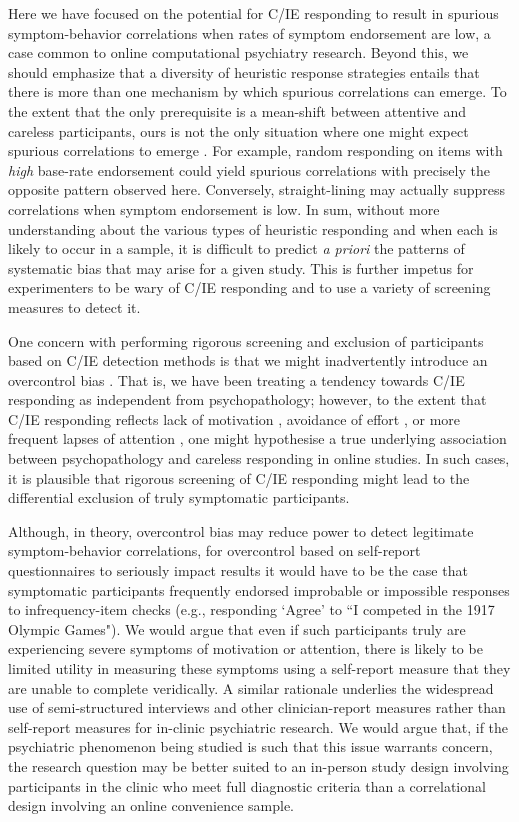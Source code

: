 \documentclass[a4paper,notitlepage,12pt]{article}
\begin{document}
Here we have focused on the potential for C/IE responding to result in spurious symptom-behavior correlations when rates of symptom endorsement are low, a case common to online computational psychiatry research. Beyond this, we should emphasize that a diversity of heuristic response strategies entails that there is more than one mechanism by which spurious correlations can emerge. To the extent that the only prerequisite is a mean-shift between attentive and careless participants, ours is not the only situation where one might expect spurious correlations to emerge \cite{huang2015insufficient}. For example, random responding on items with \emph{high} base-rate endorsement could yield spurious correlations with precisely the opposite pattern observed here. Conversely, straight-lining may actually suppress correlations when symptom endorsement is low. In sum, without more understanding about the various types of heuristic responding and when each is likely to occur in a sample, it is difficult to predict {\it a priori} the patterns of systematic bias that may arise for a given study. This is further impetus for experimenters to be wary of C/IE responding and to use a variety of screening measures to detect it. 

One concern with performing rigorous screening and exclusion of participants based on C/IE detection methods is that we might inadvertently introduce an overcontrol bias \cite{elwert2014endogenous}. That is, we have been treating a tendency towards C/IE responding as independent from psychopathology; however, to the extent that C/IE responding reflects lack of motivation \cite{barch2015mechanisms}, avoidance of effort \cite{cohen2001impairments, culbreth2016negative}, or more frequent lapses of attention \cite{kane2016individual, robison2017neurotic}, one might hypothesise a true underlying association between psychopathology and careless responding in online studies. In such cases, it is plausible that rigorous screening of C/IE responding might lead to the differential exclusion of truly symptomatic participants. 

Although, in theory, overcontrol bias may reduce power to detect legitimate symptom-behavior correlations, for overcontrol based on self-report questionnaires to seriously impact results it would have to be the case that symptomatic participants frequently endorsed improbable or impossible responses to infrequency-item checks (e.g., responding `Agree' to ``I competed in the 1917 Olympic Games"). We would argue that even if such participants truly are experiencing severe symptoms of motivation or attention, there is likely to be limited utility in measuring these symptoms using a self-report measure that they are unable to complete veridically. A similar rationale underlies the widespread use of semi-structured interviews and other clinician-report measures rather than self-report measures for in-clinic psychiatric research. We would argue that, if the psychiatric phenomenon being studied is such that this issue warrants concern, the research question may be better suited to an in-person study design involving participants in the clinic who meet full diagnostic criteria than a correlational design involving an online convenience sample.
\end{document}
